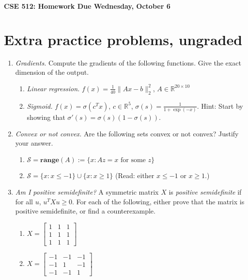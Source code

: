 \documentclass{article}
\newcommand{\mypagebreak}{\begin{center}
		\noindent\makebox[\linewidth]{\rule{7.5in}{1pt}}
	\end{center}}
\newcommand{\R}{\mathbb R}
\newcommand{\mS}{\mathcal S}
\newcommand{\bmat}{\left[\begin{matrix}}
\newcommand{\emat}{\end{matrix}\right]}
\newcommand{\range}{\mathbf{range}}
\begin{document}
{\Large\textbf{CSE 512: Homework  \hfill
Due Wednesday, October 6 }}


\mypagebreak


\section*{Extra practice problems, ungraded}
\begin{enumerate}
\item \emph{Gradients.}  Compute the gradients of the following functions. Give the exact dimension of the output.

\begin{enumerate}
\item \emph{Linear regression.}  $f(x) = \frac{1}{40}\|Ax-b\|_2^2$, $A\in \R^{20\times 10}$

\item \emph{Sigmoid.} $f(x) = \sigma(c^Tx)$, $c\in \R^5$, $\sigma(s) = \frac{1}{1+\exp(-x)}$.
Hint: Start by showing that $\sigma'(s) = \sigma(s)(1-\sigma(s))$.

\end{enumerate}
\item  \emph{Convex or not convex. } Are the following sets convex or not convex? Justify your answer.

\begin{enumerate}
\item $\mS =\range(A) := \{x : Az = x \text{ for some }z\}$




\item $\mS = \{x : x \leq -1\} \cup \{x : x \geq 1\}$ (Read: either $x \leq -1$ or $x \geq 1$.)

\end{enumerate}



\item \emph{Am I positive semidefinite?}   A symmetric matrix $X$ is \emph{positive semidefinite} if for all $u$, $u^TXu \geq 0$. For each of the following, either prove that the matrix is positive semidefinite, or find a counterexample. 

\begin{enumerate}
\item 
$
X = \bmat 
1 & 1 & 1 \\ 1& 1 & 1 \\ 1 & 1& 1
\emat
$



\item 
$
X = \bmat 
-1 & -1 & -1 \\ -1& 1 & -1 \\ -1 & -1& 1
\emat
$








\end{enumerate}
\end{enumerate}
\end{document}
